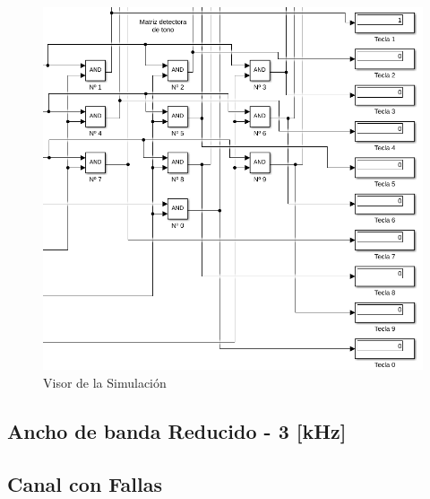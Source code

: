 \begin{figure}[!htb]
  \centering
  \includegraphics[width=400pt]{images/simulacion/extendido/sim.png}
  \caption{Visor de la Simulación}
  \label{fig:sim_sim}
\end{figure}

\subsection{Ancho de banda Reducido - 3 [kHz]}


\subsection{Canal con Fallas}